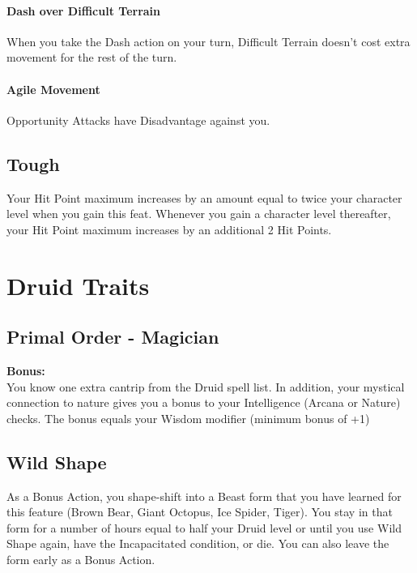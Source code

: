 \documentclass[letterpaper,openany,oneside,twocolumn]{book}
\begin{document}
\paragraph*{Dash over Difficult Terrain} When you take the Dash action on your turn, Difficult Terrain doesn't cost extra movement for the rest of the turn.
\paragraph*{Agile Movement} Opportunity Attacks have Disadvantage against you.
\subsection*{Tough}
Your Hit Point maximum increases by an amount equal to twice your character level when you gain this feat. Whenever you gain a character level thereafter, your Hit Point maximum increases by an additional 2 Hit Points.

\section*{Druid Traits}
\subsection*{Primal Order - Magician}
\textbf{Bonus:} \calculateModifier{\WisdomScoreValue}\\
You know one extra cantrip from the Druid spell list. In addition, your mystical connection to nature gives you a bonus to your Intelligence (Arcana or Nature) checks. The bonus equals your Wisdom modifier (minimum bonus of +1)
\subsection*{Wild Shape}
As a Bonus Action, you shape-shift into a Beast form that you have learned for this feature (Brown Bear, Giant Octopus, Ice Spider, Tiger). You stay in that form for a number of hours equal to half your Druid level or until you use Wild Shape again, have the Incapacitated condition, or die. You can also leave the form early as a Bonus Action.
\end{document}
